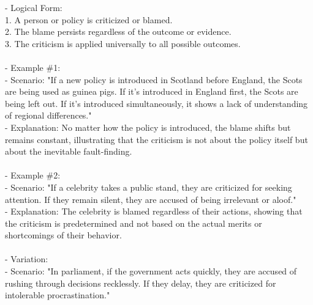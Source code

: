\documentclass[a4paper,12pt,single,pdftex]{scrartcl}
\begin{document}
    
      - Logical Form:
    \\

    
        1. A person or policy is criticized or blamed.
    \\

    
        2. The blame persists regardless of the outcome or evidence.
    \\

    
        3. The criticism is applied universally to all possible outcomes.
    \\

    
      
    \\

    
      - Example \#1:
    \\

    
        - Scenario: "If a new policy is introduced in Scotland before England, the Scots are being used as guinea pigs. If it’s introduced in England first, the Scots are being left out. If it’s introduced simultaneously, it shows a lack of understanding of regional differences."
    \\

    
        - Explanation: No matter how the policy is introduced, the blame shifts but remains constant, illustrating that the criticism is not about the policy itself but about the inevitable fault-finding.
    \\

    
      
    \\

    
      - Example \#2:
    \\

    
        - Scenario: "If a celebrity takes a public stand, they are criticized for seeking attention. If they remain silent, they are accused of being irrelevant or aloof."
    \\

    
        - Explanation: The celebrity is blamed regardless of their actions, showing that the criticism is predetermined and not based on the actual merits or shortcomings of their behavior.
    \\

    
      
    \\

    
      - Variation:
    \\

    
        - Scenario: "In parliament, if the government acts quickly, they are accused of rushing through decisions recklessly. If they delay, they are criticized for intolerable procrastination."
    \\
\end{document}
